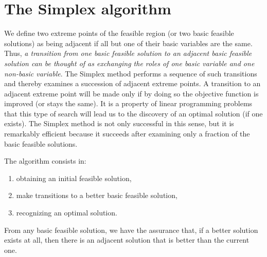 \documentclass[c]{beamer}
\begin{document}
\section{The Simplex algorithm}

\begin{frame}
We define
two extreme points of the feasible region (or two basic feasible solutions) as being adjacent if all but one of their basic variables are the same. Thus, {\em a transition from one basic
feasible solution to an adjacent basic feasible solution can be thought of as exchanging
the roles of one basic variable and one non-basic variable}. The Simplex method performs a sequence of such transitions and thereby examines a succession of adjacent
extreme points. A transition to an adjacent extreme point will be made only if by doing
so the objective function is improved (or stays the same). It is a property of linear programming problems that this type of search will lead us to the discovery of an optimal
solution (if one exists). The Simplex method is not only successful in this sense, but it
is remarkably efficient because it succeeds after examining only a fraction of the basic
feasible solutions.\cite{carter}
\end{frame}

\begin{frame}
The algorithm consists in:
\begin{enumerate}
  \item obtaining an initial feasible
solution,
\item make transitions to a better basic feasible solution,
\item recognizing an optimal solution.
\end{enumerate}
From any basic feasible solution, we have the assurance
that, if a better solution exists at all, then there is an adjacent solution that is better than the
current one.\cite{carter}
\end{frame}
\end{document}
